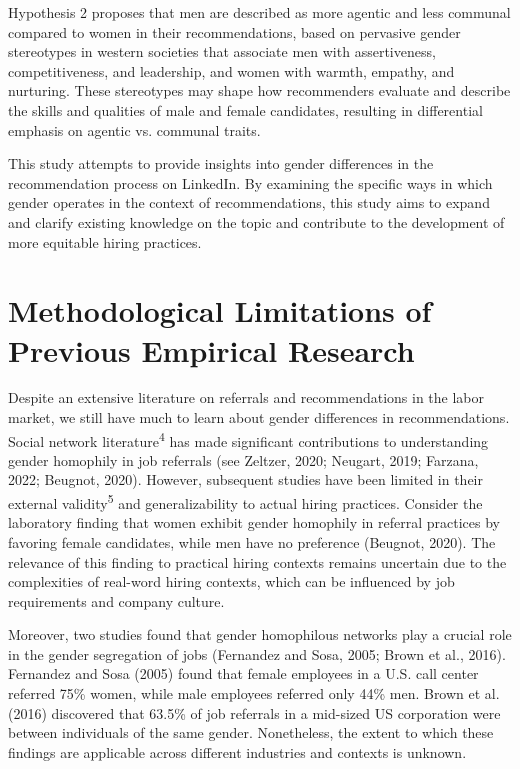 \documentclass[12pt]{caltech_thesis}
\begin{document}
Hypothesis 2 proposes that men are described as more agentic and less communal compared to women in their recommendations, based on pervasive gender stereotypes in western societies that associate men with assertiveness, competitiveness, and leadership, and women with warmth, empathy, and nurturing. These stereotypes may shape how recommenders evaluate and describe the skills and qualities of male and female candidates, resulting in differential emphasis on agentic vs. communal traits.

This study attempts to provide insights into gender differences in the recommendation process on LinkedIn. By examining the specific ways in which gender operates in the context of recommendations, this study aims to expand and clarify existing knowledge on the topic and contribute to the development of more equitable hiring practices.

\section{Methodological Limitations of Previous Empirical Research}
Despite an extensive literature on referrals and recommendations in the labor market, we still have much to learn about gender differences in recommendations. Social network literature\textsuperscript{4} has made significant contributions to understanding gender homophily in job referrals (see Zeltzer, 2020; Neugart, 2019; Farzana, 2022; Beugnot, 2020). However, subsequent studies have been limited in their external validity\textsuperscript{5} and generalizability to actual hiring practices. Consider the laboratory finding that women exhibit gender homophily in referral practices by favoring female candidates, while men have no preference (Beugnot, 2020). The relevance of this finding to practical hiring contexts remains uncertain due to the complexities of real-word hiring contexts, which can be influenced by job requirements and company culture. 

Moreover, two studies found that gender homophilous networks play a crucial role in the gender segregation of jobs (Fernandez and Sosa, 2005; Brown et al., 2016). Fernandez and Sosa (2005) found that female employees in a U.S. call center referred 75\% women, while male employees referred only 44\% men. Brown et al. (2016) discovered that 63.5\% of job referrals in a mid-sized US corporation were between individuals of the same gender. Nonetheless, the extent to which these findings are applicable across different industries and contexts is unknown. 
\end{document}
